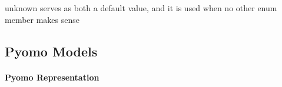 \documentclass[letterpaper,10pt,english]{sphinxmanual}
\begin{document}
\begin{fulllineitems}
\begin{fulllineitems}
\end{fulllineitems}


\begin{fulllineitems}
\label{\detokenize{reference/solverapi:pao.common.solver.TerminationCondition.unknown}}
unknown serves as both a default value, and it is used when no other enum member makes sense

\end{fulllineitems}


\end{fulllineitems}



\subsection{Pyomo Models}
\label{\detokenize{reference/pyomo:pyomo-models}}\label{\detokenize{reference/pyomo::doc}}

\paragraph{Pyomo Representation}
\label{\detokenize{reference/pyomo:pyomo-representation}}
\end{document}
